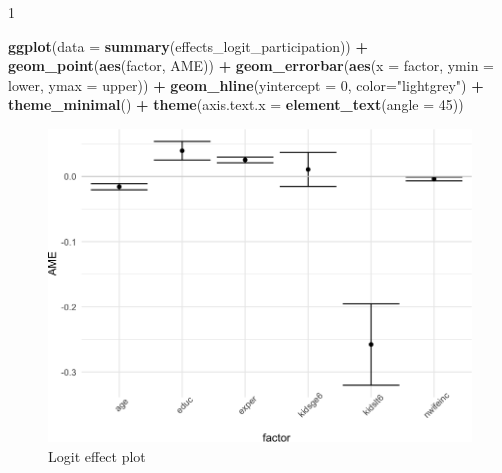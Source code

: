 \documentclass[]{book}
\newenvironment{Shaded}{\begin{snugshade}}{\end{snugshade}}
\newcommand{\DataTypeTok}[1]{\textcolor[rgb]{0.13,0.29,0.53}{#1}}
\newcommand{\DecValTok}[1]{\textcolor[rgb]{0.00,0.00,0.81}{#1}}
\newcommand{\KeywordTok}[1]{\textcolor[rgb]{0.13,0.29,0.53}{\textbf{#1}}}
\newcommand{\NormalTok}[1]{#1}
\newcommand{\OperatorTok}[1]{\textcolor[rgb]{0.81,0.36,0.00}{\textbf{#1}}}
\newcommand{\StringTok}[1]{\textcolor[rgb]{0.31,0.60,0.02}{#1}}
\begin{document}
\begin{table}[h]
\begin{raggedright}
\begin{threeparttable}
\begin{tabularx}{1\textwidth}
\end{tabularx}\end{threeparttable}
\par\end{raggedright}

\end{table}
 

\begin{Shaded}
\begin{Highlighting}[]
\KeywordTok{ggplot}\NormalTok{(}\DataTypeTok{data =} \KeywordTok{summary}\NormalTok{(effects_logit_participation)) }\OperatorTok{+}
\StringTok{  }\KeywordTok{geom_point}\NormalTok{(}\KeywordTok{aes}\NormalTok{(factor, AME)) }\OperatorTok{+}
\StringTok{  }\KeywordTok{geom_errorbar}\NormalTok{(}\KeywordTok{aes}\NormalTok{(}\DataTypeTok{x =}\NormalTok{ factor, }\DataTypeTok{ymin =}\NormalTok{ lower, }\DataTypeTok{ymax =}\NormalTok{ upper)) }\OperatorTok{+}
\StringTok{  }\KeywordTok{geom_hline}\NormalTok{(}\DataTypeTok{yintercept =} \DecValTok{0}\NormalTok{, }\DataTypeTok{color=}\StringTok{"lightgrey"}\NormalTok{) }\OperatorTok{+}
\StringTok{  }\KeywordTok{theme_minimal}\NormalTok{() }\OperatorTok{+}
\StringTok{  }\KeywordTok{theme}\NormalTok{(}\DataTypeTok{axis.text.x =} \KeywordTok{element_text}\NormalTok{(}\DataTypeTok{angle =} \DecValTok{45}\NormalTok{))}
\end{Highlighting}
\end{Shaded}

\begin{figure}

{\centering \includegraphics[width=0.8\linewidth]{MEM5220_R_files/figure-latex/fig23-1} 

}

\caption{Logit effect plot}\label{fig:fig23}
\end{figure}
\end{document}
